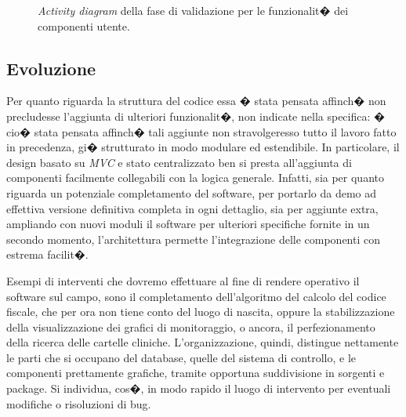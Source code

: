 \documentclass[final, smallexted]{svjour3}
\begin{document}
\begin{figure}[t]
	\caption{\textit{Activity diagram} della fase di validazione per le funzionalit� dei componenti utente.}
\end{figure}
%

\subsection{Evoluzione}
Per quanto riguarda la struttura del codice essa � stata pensata affinch� non precludesse l'aggiunta di ulteriori funzionalit�, non indicate nella specifica: � cio� stata pensata affinch� tali aggiunte non stravolgeresso tutto il lavoro fatto in precedenza, gi� strutturato in modo modulare ed estendibile. In particolare, il design basato su \textit{MVC} e stato centralizzato ben si presta all'aggiunta di componenti facilmente collegabili con la logica generale.
Infatti, sia per quanto riguarda un potenziale completamento del software, per portarlo da demo ad effettiva versione definitiva completa in ogni dettaglio, sia per aggiunte extra, ampliando con nuovi moduli il software per ulteriori specifiche fornite in un secondo momento, l'architettura permette l'integrazione delle componenti con estrema facilit�.

Esempi di interventi che dovremo effettuare al fine di rendere operativo il software sul campo, sono il completamento dell'algoritmo del calcolo del codice fiscale, che per ora non tiene conto del luogo di nascita, oppure la stabilizzazione della visualizzazione dei grafici di monitoraggio, o ancora, il perfezionamento della ricerca delle cartelle cliniche.
L'organizzazione, quindi, distingue nettamente le parti che si occupano del database, quelle del sistema di controllo, e le componenti prettamente grafiche, tramite opportuna suddivisione in sorgenti e package. Si individua, cos�, in modo rapido il luogo di intervento per eventuali modifiche o risoluzioni di bug.
\end{document}
